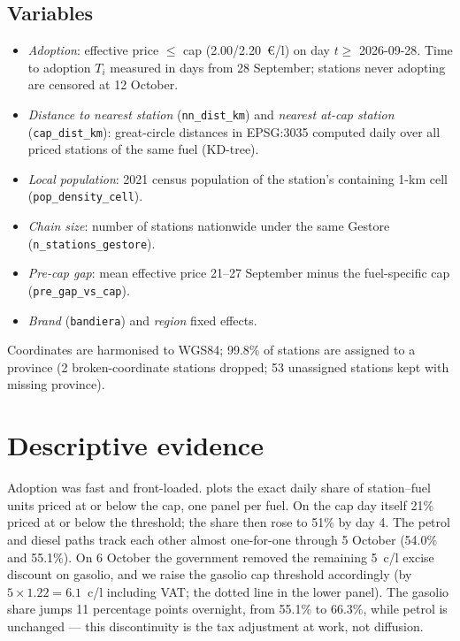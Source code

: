 \documentclass[11pt]{article}
\begin{document}
\subsection{Variables}
\label{sec:variables}

\begin{itemize}
\item \emph{Adoption}: effective price $\le$ cap (2.00/2.20~\euro/l) on
day $t \ge$ 2026-09-28. Time to adoption $T_i$ measured in days from
28 September; stations never adopting are censored at 12 October.
\item \emph{Distance to nearest station} (\texttt{nn\_dist\_km}) and
\emph{nearest at-cap station} (\texttt{cap\_dist\_km}): great-circle
distances in EPSG:3035 computed daily over all priced stations of the
same fuel (KD-tree).
\item \emph{Local population}: 2021 census population of the station's
containing 1-km cell (\texttt{pop\_density\_cell}).
\item \emph{Chain size}: number of stations nationwide under the same
Gestore (\texttt{n\_stations\_gestore}).
\item \emph{Pre-cap gap}: mean effective price 21--27 September minus
the fuel-specific cap (\texttt{pre\_gap\_vs\_cap}).
\item \emph{Brand} (\texttt{bandiera}) and \emph{region} fixed effects.
\end{itemize}
Coordinates are harmonised to WGS84; 99.8\% of stations are assigned to
a province (2 broken-coordinate stations dropped; 53 unassigned
stations kept with missing province).

\section{Descriptive evidence}
\label{sec:descriptive}

Adoption was fast and front-loaded.  plots the exact
daily share of station--fuel units priced at or below the cap, one
panel per fuel. On the cap day itself 21\% priced at or below the
threshold; the share then rose to 51\% by day 4. The petrol and diesel
paths track each other almost one-for-one through 5 October (54.0\% and
55.1\%). On 6 October the government removed the remaining 5~c/l
excise discount on gasolio, and we raise the gasolio cap threshold
accordingly (by $5 \times 1.22 = 6.1$~c/l including VAT; the dotted
line in the lower panel). The gasolio share jumps 11 percentage points
overnight, from 55.1\% to 66.3\%, while petrol is unchanged --- this
discontinuity is the tax adjustment at work, not diffusion.
\end{document}
